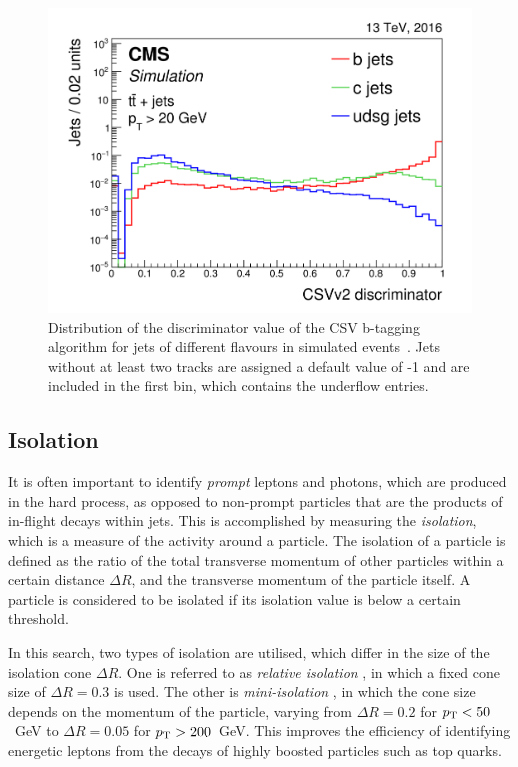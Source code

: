 \begin{figure}
\begin{center}
\includegraphics[width=0.8\linewidth]{figs/detector/btagcsv}
\end{center}
\caption{Distribution of the discriminator value of the CSV b-tagging algorithm 
for jets of different flavours in simulated \ttbar events~\cite{btagging}. Jets 
without at least two tracks are assigned a default value of -1 and are included 
in the first bin, which contains the underflow entries.}
\label{fig:btagcsv}
\end{figure}

\subsection{Isolation}%
\label{sec:detector-isolation}
It is often important to identify \textit{prompt} leptons and photons, which 
are produced in the hard process, %
as opposed to non-prompt 
particles that are the products of in-flight decays within jets. 
This is 
accomplished by measuring the \textit{isolation}, which is a measure of the 
activity around a particle. The isolation of a particle is defined as the ratio 
of the total transverse momentum of other particles within a certain distance 
$\Delta R$, and the transverse momentum of the particle itself. A particle is 
considered to be isolated if its isolation value is below a certain threshold.

In this search, two types of isolation are utilised, which differ in the size 
of the isolation cone $\Delta R$. One is referred to as \textit{relative 
isolation} \reliso, in which a fixed cone size of $\Delta R = 0.3$ is used. The 
other is \textit{mini-isolation} \miniiso, in which the cone size depends on 
the momentum of the particle, varying from $\Delta R = 0.2$ for ${p_{\text T}} < 50$~GeV 
to $\Delta R = 0.05$ for ${p_{\text T}} > 200$~GeV. This improves the efficiency of 
identifying energetic leptons from the decays of highly boosted particles such 
as top quarks. 

